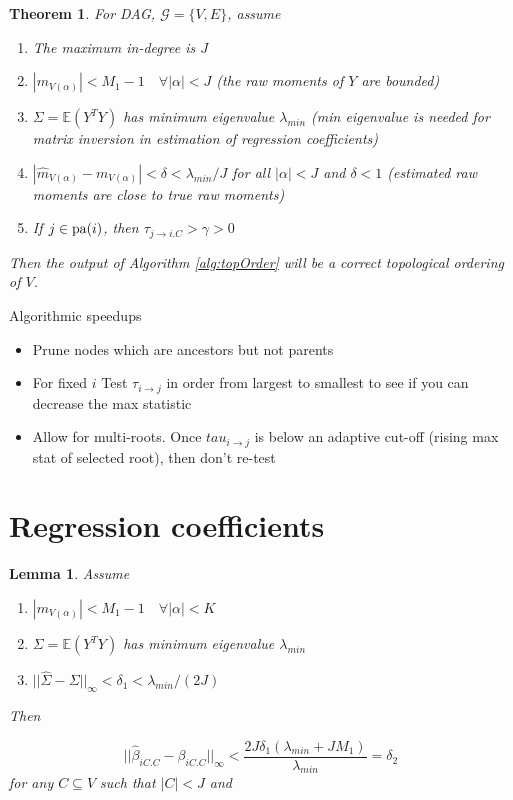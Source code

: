 \documentclass[]{article}
\newtheorem{theorem}{Theorem}
\newtheorem{lemma}{Lemma}
\newcommand{\E}{\mathbb{E}}
\newcommand{\pa}{{\rm pa}}       %
\begin{document}
\begin{theorem}
For DAG, $\mathcal{G} = \{V,E\}$, assume
\begin{enumerate}
\item The maximum in-degree is $J$
\item $|m_{V(\alpha)}| < M_1 - 1 \quad \forall |\alpha| < J$ (the raw moments of $Y$ are bounded)
\item $\Sigma = \E(Y^T Y)$ has minimum eigenvalue $\lambda_{min}$ (min eigenvalue is needed for matrix inversion in estimation of regression coefficients)
\item $|\hat m_{V(\alpha)} - m_{V(\alpha)}| < \delta < \lambda_{min}/J$ for all $|\alpha| < J$ and $\delta < 1$ (estimated raw moments are close to true raw moments)
\item If $j \in \pa(i)$, then $\tau_{j\rightarrow i.C} > \gamma > 0$
\end{enumerate}

Then the output of Algorithm \ref{alg:topOrder} will be a correct topological ordering of $V$.
\end{theorem}

Algorithmic speedups
\begin{itemize}
\item Prune nodes which are ancestors but not parents
\item For fixed $i$ Test $\tau_{i \rightarrow j}$ in order from largest to smallest to see if you can decrease the max statistic
\item Allow for multi-roots. Once $tau_{i\rightarrow j}$ is below an adaptive cut-off (rising max stat of selected root), then don't re-test
\end{itemize}

\section{Regression coefficients}

\begin{lemma}
Assume

\begin{enumerate}
\item $|m_{V(\alpha)}| < M_1 - 1 \quad \forall |\alpha| < K$
\item  $\Sigma = \E(Y^T Y)$ has minimum eigenvalue $\lambda_{min}$
\item $||\hat \Sigma  - \Sigma ||_\infty < \delta_1 < \lambda_{min}/(2J)$
\end{enumerate}

Then

\[|| \hat \beta_{iC.C} - \beta_{iC.C} ||_\infty < \frac{2J \delta_1 \left( \lambda_{min} + J M_1\right)}{\lambda_{min}} = \delta_2\]
for any $C \subseteq V$ such that $|C| < J$ and
\end{lemma}
\end{document}
